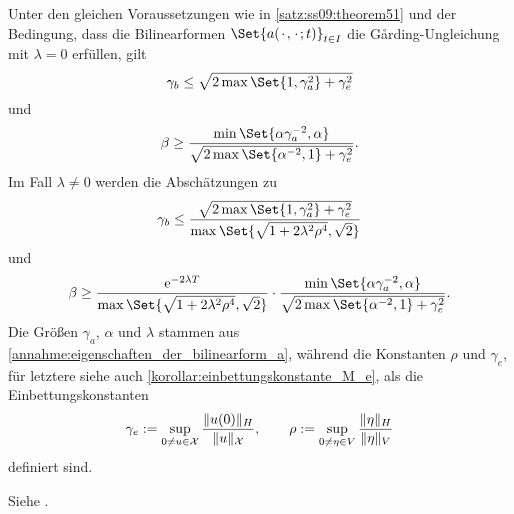 \documentclass[../main.tex]{subfiles}
\begin{document}

\begin{Korollar}
\label{korrolar:ss09:theorem51_abschaetzungen}
    Unter den gleichen Voraussetzungen wie in \cref{satz:ss09:theorem51} und der Bedingung, dass die Bilinearformen $\Set{a(\blank, \blank; t)}_{t \in I}$ die G\aa{}rding-Ungleichung mit $\lambda = 0$ erfüllen, gilt
    \begin{equation}
        \label{eq:ss09:theorem51_abschaetzungen:lambda_null:stetig}
        \gamma_{b}  \leq \sqrt{2 \max\Set{1, \gamma_{a}^{2}} + \gamma_{e}^{2}}
    \end{equation}
    und
    \begin{equation}
        \label{eq:ss09:theorem51_abschaetzungen:lambda_null:inf_sup}
        \beta  \geq \frac{\min\Set{\alpha \gamma_{a}^{-2}, \alpha}}{\sqrt{2 \max \Set{\alpha^{-2}, 1} + \gamma_{e}^{2}}}.
    \end{equation}
    Im Fall $\lambda \neq 0$ werden die Abschätzungen zu
    \begin{equation}
        \label{eq:ss09:theorem51_abschaetzungen:lambda_nicht_null:stetig}
        \gamma_{b}  \leq \frac{\sqrt{2\max\Set{1, \gamma_{a}^{2}} + \gamma_{e}^{2}}}{\max\Set{\sqrt{1 + 2 \lambda^{2} \rho^{4}}, \sqrt{2}}}
    \end{equation}
    und
    \begin{equation}
        \label{eq:ss09:theorem51_abschaetzungen:lambda_nicht_null:inf_sup}
        \beta  \geq \frac{ \ee^{-2 \lambda T}}{\max\Set{\sqrt{1 + 2 \lambda^{2} \rho^{4}}, \sqrt{2}}  } \cdot \frac{\min\Set{\alpha \gamma_{a}^{-2}, \alpha}}{\sqrt{2 \max\Set{ \alpha^{-2}, 1} + \gamma_{e}^{2}}}.
    \end{equation}
    Die Größen $\gamma_{a}$, $\alpha$ und $\lambda$ stammen aus \cref{annahme:eigenschaften_der_bilinearform_a},
    während die Konstanten $\rho$ und $\gamma_{e}$, für letztere siehe auch \cref{korollar:einbettungskonstante_M_e}, als die Einbettungskonstanten
    \begin{equation}
        \label{eq:ss09:einbettungskonstanten}
        \gamma_{e} := \sup_{0 \neq u \in \mathcal X} \frac{\lVert u(0)\rVert_{H}}{\lVert u\rVert_{\mathcal X}}, \qquad
        \rho := \sup_{0 \neq \eta \in V} \frac{\lVert\eta\rVert_{H}}{\lVert\eta\rVert_{V}}
    \end{equation}
    definiert sind.

    \begin{Beweis}
        Siehe \cite[Appendix A]{Schwab:2009ec}.
    \end{Beweis}
\end{Korollar}
\end{document}
